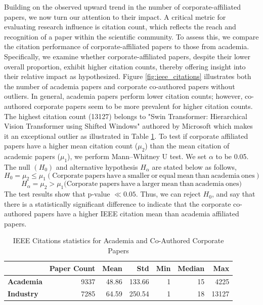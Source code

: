 \documentclass{article}
\begin{document}
Building on the observed upward trend in the number of corporate-affiliated papers, we now turn our attention to their impact. A critical metric for evaluating research influence is citation count, which reflects the reach and recognition of a paper within the scientific community. To assess this, we compare the citation performance of corporate-affiliated papers to those from academia. Specifically, we examine whether corporate-affiliated papers, despite their lower overall proportion, exhibit higher citation counts, thereby offering insight into their relative impact as hypothesized. Figure \ref{fig:ieee_citations} illustrates both the number of academia papers and corporate co-authored papers without outliers. In general, academia papers perform lower citation counts; however, co-authored corporate papers seem to be more prevalent for higher citation counts. The highest citation count (13127) belongs to "Swin Transformer: Hierarchical Vision Transformer using Shifted Windows" authored by Microsoft which makes it an exceptional outlier as illustrated in Table \ref{tab:ieee_citations}. To test if corporate affiliated papers have a higher mean citation count ($\mu_2$) than the mean citation of academic papers ($\mu_1$), we perform Mann–Whitney U test. We set $\alpha$ to be 0.05. The null $(H_0)$ and alternative hypothesis $H_\alpha$ are stated below as follows,
\[
H_0 = \mu_2 \leq \mu_1 (\mathrm{Corporate \ papers\ have \ a \ smaller \ or \ equal \ mean \ than \ academia \ ones})
\]
\[
H_\alpha = \mu_2 > \mu_1 (\mathrm{Corporate \ papers\ have \ a \ larger \ mean\ than \ academia \ ones)}
\]
The test results show that p-value $\ll 0.05$. Thus, we can reject $H_0$, and say that there is a statistically significant difference to indicate that the corporate co-authored papers have a higher IEEE citation mean than academia affiliated papers.   

\begin{table}[h]
    \centering
    \begin{tabular}{|l|r|r|r|r|r|r|}
        \hline
        & \textbf{Paper Count} & \textbf{Mean} & \textbf{Std} & \textbf{Min} & \textbf{Median} & \textbf{Max} \\
        \hline
        \textbf{Academia} & 9337 & 48.86 & 133.66 & 1 & 15 & 4225 \\
        \hline
        \textbf{Industry} & 7285 & 64.59 & 250.54 & 1 & 18 & 13127 \\
        \hline
    \end{tabular}
    \caption{IEEE Citations statistics for Academia and Co-Authored Corporate Papers}
    \label{tab:ieee_citations}
\end{table}
\end{document}
